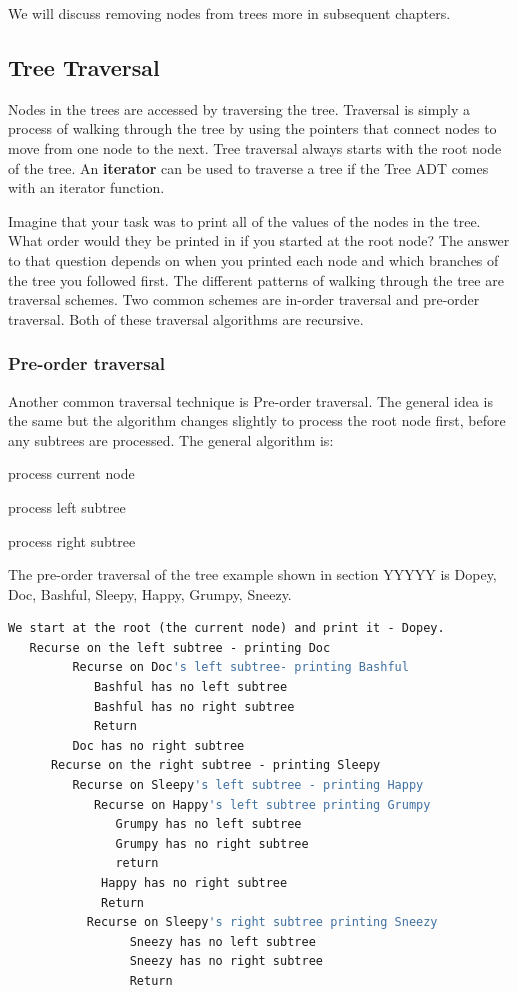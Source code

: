 We will discuss removing nodes from trees more in subsequent chapters.

\subsection{Tree Traversal}

Nodes in the trees are accessed by traversing the tree. Traversal is
simply a process of walking through the tree by using the pointers that
connect nodes to move from one node to the next. Tree traversal always
starts with the root node of the tree.   An \textbf{iterator} can be used to traverse a tree if the Tree ADT comes with an iterator function.

Imagine that your task was to print all of the values of the nodes in
the tree. What order would they be printed in if you started at the root
node? The answer to that question depends on when you printed each node
and which branches of the tree you followed first. The different
patterns of walking through the tree are traversal schemes.  Two common
schemes are in-order traversal and pre-order traversal.  Both of these traversal algorithms are recursive.



\subsubsection{Pre-order traversal}

Another common traversal technique is Pre-order traversal. The general
idea is the same but the algorithm changes slightly to process the root
node first, before any subtrees are processed. The general algorithm is:

process current node

process left subtree

process right subtree


The pre-order traversal of the tree example shown in section YYYYY is
 Dopey, Doc, Bashful, Sleepy, Happy, Grumpy, Sneezy.
 
 \begin{lstlisting}[showspaces=false, language=make]
 We start at the root (the current node) and print it - Dopey.
   Recurse on the left subtree - printing Doc
         Recurse on Doc's left subtree- printing Bashful
            Bashful has no left subtree
            Bashful has no right subtree
            Return
         Doc has no right subtree
      Recurse on the right subtree - printing Sleepy
         Recurse on Sleepy's left subtree - printing Happy
            Recurse on Happy's left subtree printing Grumpy
               Grumpy has no left subtree
               Grumpy has no right subtree
               return
             Happy has no right subtree
             Return
           Recurse on Sleepy's right subtree printing Sneezy
                 Sneezy has no left subtree
                 Sneezy has no right subtree
                 Return
\end{lstlisting}		     		
				
